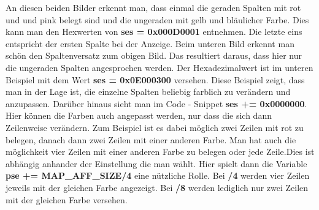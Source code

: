 An diesen beiden Bilder erkennt man, dass einmal die geraden Spalten mit rot und und pink belegt sind und die ungeraden mit gelb und bläulicher Farbe. Dies kann man den Hexwerten von \textbf{ses = 0x000D0001} entnehmen. Die letzte eins entspricht der ersten Spalte bei der Anzeige. Beim unteren Bild erkennt man schön den Spaltenversatz zum obigen Bild. Das resultiert daraus, dass hier nur die ungeraden Spalten angesprochen werden. Der Hexadezimalwert ist im unteren Beispiel mit dem Wert \textbf{ses = 0x0E000300} versehen. Diese Beispiel zeigt, dass man in der Lage ist, die einzelne Spalten beliebig farblich zu verändern und anzupassen. Darüber hinaus sieht man im Code - Snippet \textbf{ses += 0x0000000}. Hier können die Farben auch angepasst werden, nur dass die sich dann Zeilenweise verändern. Zum Beispiel ist es dabei möglich zwei Zeilen mit rot zu belegen, danach dann zwei Zeilen mit einer anderen Farbe. Man hat auch die möglichkeit vier Zeilen mit einer anderen Farbe zu belegen oder jede Zeile.Dies ist abhängig anhander der Einstellung die man wählt. Hier spielt dann die Variable \textbf{pse += MAP\_AFF\_SIZE/4} eine nützliche Rolle. Bei \textbf{/4} werden vier Zeilen jeweils mit der gleichen Farbe angezeigt. Bei \textbf{/8} werden lediglich nur zwei Zeilen mit der gleichen Farbe versehen.


